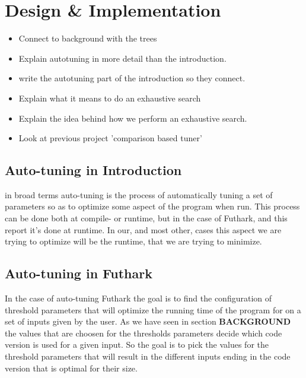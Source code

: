 \section{Design \& Implementation}

\begin{itemize}
  \item Connect to background with the trees
  \item Explain autotuning in more detail than the introduction.
    \item write the autotuning part of the introduction so they connect.
  \item Explain what it means to do an exhaustive search
  \item Explain the idea behind how we perform an exhaustive search.
    \item Look at previous project 'comparison based tuner'
\end{itemize}

\subsection{Auto-tuning in Introduction}
in broad terms auto-tuning is the process of automatically tuning a set of
parameters so as to optimize some aspect of the program when run. This
process can be done both at compile- or runtime, but in the case of Futhark,
and this report it's done at runtime. In our, and most other, cases this aspect
we are trying to optimize will be the runtime, that we are trying to minimize. 


\subsection{Auto-tuning in Futhark} %
In the case of auto-tuning Futhark the goal is to find the configuration of 
threshold parameters that will optimize the running time of the program for 
on a set of inputs given by the user. As we have seen in section \textbf{BACKGROUND}
the values that are choosen for the thresholds parameters decide which code
version is used for a given input. So the goal is to pick the values for the
threshold parameters that will result in the different inputs ending in the
code version that is optimal for their size.

